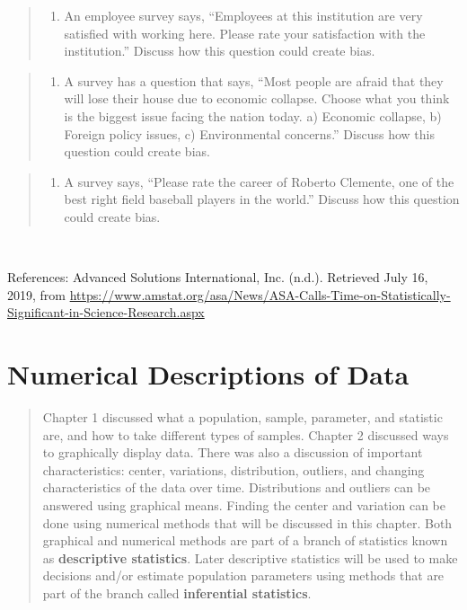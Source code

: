 \documentclass[]{book}
\providecommand{\tightlist}{%
  \setlength{\itemsep}{0pt}\setlength{\parskip}{0pt}}
\begin{document}
\begin{quote}
\begin{enumerate}
\def\labelenumi{\arabic{enumi}.}
\setcounter{enumi}{13}
\tightlist
\item
  An employee survey says, ``Employees at this institution are very satisfied with working here. Please rate your satisfaction with the institution.'' Discuss how this question could create bias.
\end{enumerate}
\end{quote}

\begin{quote}
\begin{enumerate}
\def\labelenumi{\arabic{enumi}.}
\setcounter{enumi}{14}
\tightlist
\item
  A survey has a question that says, ``Most people are afraid that they will lose their house due to economic collapse. Choose what you think is the biggest issue facing the nation today. a) Economic collapse, b) Foreign policy issues, c) Environmental concerns.'' Discuss how this question could create bias.
\end{enumerate}
\end{quote}

\begin{quote}
\begin{enumerate}
\def\labelenumi{\arabic{enumi}.}
\setcounter{enumi}{15}
\tightlist
\item
  A survey says, ``Please rate the career of Roberto Clemente, one of the best right field baseball players in the world.'' Discuss how this question could create bias.
\end{enumerate}
\end{quote}

\emph{\\
}

References:
Advanced Solutions International, Inc. (n.d.). Retrieved July 16, 2019, from \url{https://www.amstat.org/asa/News/ASA-Calls-Time-on-Statistically-Significant-in-Science-Research.aspx}

\hypertarget{numerical-descriptions-of-data}{%
\chapter{Numerical Descriptions of Data}\label{numerical-descriptions-of-data}}

\begin{quote}
Chapter 1 discussed what a population, sample, parameter, and statistic are, and how to take different types of samples. Chapter 2 discussed ways to graphically display data. There was also a discussion of important characteristics: center, variations, distribution, outliers, and changing characteristics of the data over time. Distributions and outliers can be answered using graphical means. Finding the center and variation can be done using numerical methods that will be discussed in this chapter. Both graphical and numerical methods are part of a branch of statistics known as \textbf{descriptive statistics}. Later descriptive statistics will be used to make decisions and/or estimate population parameters using methods that are part of the branch called \textbf{inferential statistics}.
\end{quote}
\end{document}
